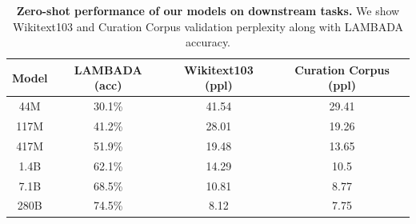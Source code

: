 \documentclass[11pt, a4paper, logo, internal, copyright, nonumbering]{deepmind}
\begin{document}
\begin{table}[t]
    \centering
    \begin{tabular}{cccc}
    \toprule
        \textbf{Model} & \textbf{LAMBADA (acc)} & \textbf{Wikitext103 (ppl)} &  \textbf{Curation Corpus (ppl)} \\
        \midrule
         44M &  30.1\% & 41.54 & 29.41 \\
         117M & 41.2\% & 28.01 & 19.26 \\
         417M & 51.9\% &  19.48 & 13.65 \\
         1.4B & 62.1\% & 14.29 & 10.5 \\
         7.1B & 68.5\% & 10.81 & 8.77 \\
         280B & 74.5\% & 8.12 & 7.75  \\
     \bottomrule
    \end{tabular}
    \caption{\textbf{Zero-shot performance of our models on downstream tasks.} We show Wikitext103  and Curation Corpus validation perplexity along with LAMBADA accuracy.
    }
    \label{tab:perf}
\end{table}
\end{document}
